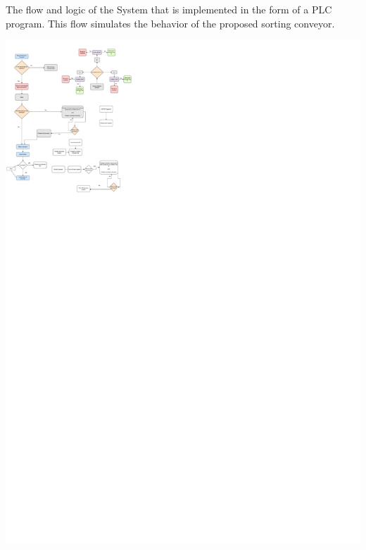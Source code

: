 The flow and logic of the System that is implemented in the form of a PLC program. This flow simulates the behavior of the proposed sorting conveyor.

\hspace{-3cm}\includegraphics[scale=0.6]{external/logic.pdf}